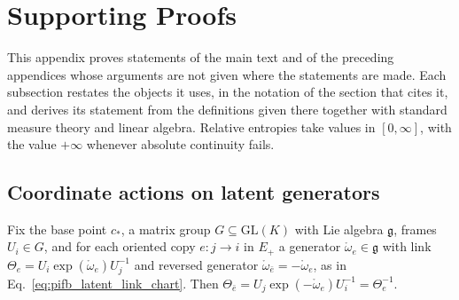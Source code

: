 \clearpage
\section{Supporting Proofs}\label{app:supporting_proofs}

This appendix proves statements of the main text and of the preceding appendices whose arguments are not given where the statements are made. Each subsection restates the objects it uses, in the notation of the section that cites it, and derives its statement from the definitions given there together with standard measure theory and linear algebra. Relative entropies take values in $[0,\infty]$, with the value $+\infty$ whenever absolute continuity fails.

\subsection{Coordinate actions on latent generators}\label{app:sp_generator_gauge}
Fix the base point $c_*$, a matrix group $G\subseteq\mathrm{GL}(K)$ with Lie algebra $\mathfrak g$, frames $U_i\in G$, and for each oriented copy $e:j\to i$ in $E_+$ a generator $\mathring\omega_e\in\mathfrak g$ with link $\Theta_e=U_i\exp(\mathring\omega_e)U_j^{-1}$ and reversed generator $\mathring\omega_{\bar e}=-\mathring\omega_e$, as in Eq.~\eqref{eq:pifb_latent_link_chart}. Then $\Theta_{\bar e}=U_j\exp(-\mathring\omega_e)U_i^{-1}=\Theta_e^{-1}$.

